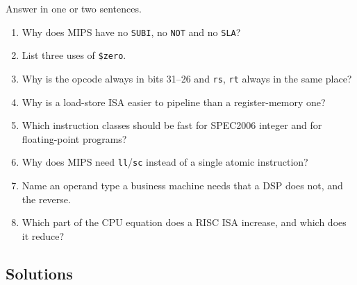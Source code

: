 \begin{exercise}\label{q:isa-short}
Answer in one or two sentences.
\begin{enumerate}[label=(\alph*),leftmargin=*]
  \item Why does MIPS have no \texttt{SUBI}, no \texttt{NOT} and no
  \texttt{SLA}?
  \item List three uses of \texttt{\$zero}.
  \item Why is the opcode always in bits 31--26 and \texttt{rs}, \texttt{rt}
  always in the same place?
  \item Why is a load-store ISA easier to pipeline than a register-memory one?
  \item Which instruction classes should be fast for SPEC2006 integer and for
  floating-point programs?
  \item Why does MIPS need \texttt{ll}/\texttt{sc} instead of a single atomic
  instruction?
  \item Name an operand type a business machine needs that a DSP does not,
  and the reverse.
  \item Which part of the CPU equation does a RISC ISA increase, and which does
  it reduce?
\end{enumerate}
\end{exercise}

\subsection{Solutions}
\label{sec:isa-sol}

